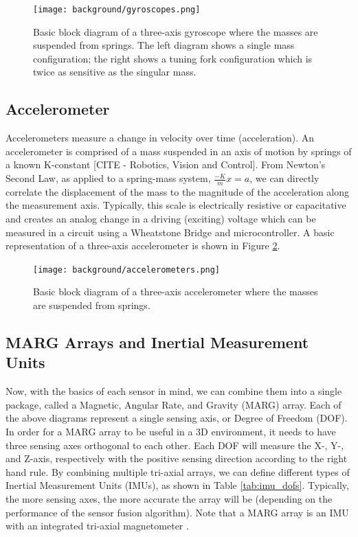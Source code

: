 \begin{figure}[h!]
    \caption[Gyroscope block diagram]{Basic block diagram of a three-axis gyroscope where the masses are suspended from springs. The left diagram shows a single mass configuration; the right shows a tuning fork configuration which is twice as sensitive as the singular mass.}
    \label{fig:gyroscopes}
    \centering
    \texttt{[image: background/gyroscopes.png]}
\end{figure}

\subsection{Accelerometer} \label{ssec:accelerometer}
Accelerometers measure a change in velocity over time (acceleration).
An accelerometer is comprised of a mass suspended in an axis of motion by springs of a known K-constant [CITE - Robotics, Vision and Control].
From Newton's Second Law, as applied to a spring-mass system, $\frac{-K}{m}x=a$, we can directly correlate the displacement of the mass to the magnitude of the acceleration along the measurement axis.
Typically, this scale is electrically resistive or capacitative and creates an analog change in a driving (exciting) voltage which can be measured in a circuit using a Wheatstone Bridge and microcontroller.
A basic representation of a three-axis accelerometer is shown in Figure \ref{fig:accelerometers}.

\begin{figure}[h!]
    \caption[Accelerometer block diagram]{Basic block diagram of a three-axis accelerometer where the masses are suspended from springs.}
    \label{fig:accelerometers}
    \centering
    \texttt{[image: background/accelerometers.png]}
\end{figure}

\subsection{MARG Arrays and Inertial Measurement Units} \label{ssec:marg_imu}
Now, with the basics of each sensor in mind, we can combine them into a single package, called a Magnetic, Angular Rate, and Gravity (MARG) array.
Each of the above diagrams represent a single sensing axis, or Degree of Freedom (DOF).
In order for a MARG array to be useful in a 3D environment, it needs to have three sensing axes orthogonal to each other.
Each DOF will measure the X-, Y-, and Z-axis, respectively with the positive sensing direction according to the right hand rule.
By combining multiple tri-axial arrays, we can define different types of Inertial Measurement Units (IMUs), as shown in Table \ref{tab:imu_dofs}.
Typically, the more sensing axes, the more accurate the array will be (depending on the performance of the sensor fusion algorithm).
Note that a MARG array is an IMU with an integrated tri-axial magnetometer .


